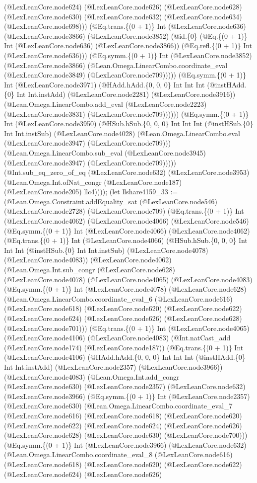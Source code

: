 \documentclass[11pt]{article}
\begin{document}
(@LexLeanCore.node624) (@LexLeanCore.node626) (@LexLeanCore.node628) (@LexLeanCore.node630) (@LexLeanCore.node632) (@LexLeanCore.node634) (@LexLeanCore.node698))) (@Eq.trans.\{(0 + 1)\} Int (@LexLeanCore.node636) (@LexLeanCore.node3866) (@LexLeanCore.node3852) (@id.\{0\} (@Eq.\{(0 + 1)\} Int (@LexLeanCore.node636) (@LexLeanCore.node3866)) (@Eq.refl.\{(0 + 1)\} Int (@LexLeanCore.node636))) (@Eq.symm.\{(0 + 1)\} Int (@LexLeanCore.node3852) (@LexLeanCore.node3866) (@Lean.Omega.LinearCombo.coordinate\_eval (@LexLeanCore.node3849) (@LexLeanCore.node709))))) (@Eq.symm.\{(0 + 1)\} Int (@LexLeanCore.node3971) (@HAdd.hAdd.\{0, 0, 0\} Int Int Int (@instHAdd.\{0\} Int Int.instAdd) (@LexLeanCore.node2281) (@LexLeanCore.node3916)) (@Lean.Omega.LinearCombo.add\_eval (@LexLeanCore.node2223) (@LexLeanCore.node3831) (@LexLeanCore.node709)))))) (@Eq.symm.\{(0 + 1)\} Int (@LexLeanCore.node3950) (@HSub.hSub.\{0, 0, 0\} Int Int Int (@instHSub.\{0\} Int Int.instSub) (@LexLeanCore.node4028) (@Lean.Omega.LinearCombo.eval (@LexLeanCore.node3947) (@LexLeanCore.node709))) (@Lean.Omega.LinearCombo.sub\_eval (@LexLeanCore.node3945) (@LexLeanCore.node3947) (@LexLeanCore.node709))))) (@Int.sub\_eq\_zero\_of\_eq (@LexLeanCore.node632) (@LexLeanCore.node3953) (@Lean.Omega.Int.ofNat\_congr (@LexLeanCore.node187) (@LexLeanCore.node205) llc4)))); (let llshare4159\_33 := (@Lean.Omega.Constraint.addEquality\_sat (@LexLeanCore.node546) (@LexLeanCore.node2728) (@LexLeanCore.node709) (@Eq.trans.\{(0 + 1)\} Int (@LexLeanCore.node4062) (@LexLeanCore.node4066) (@LexLeanCore.node546) (@Eq.symm.\{(0 + 1)\} Int (@LexLeanCore.node4066) (@LexLeanCore.node4062) (@Eq.trans.\{(0 + 1)\} Int (@LexLeanCore.node4066) (@HSub.hSub.\{0, 0, 0\} Int Int Int (@instHSub.\{0\} Int Int.instSub) (@LexLeanCore.node4078) (@LexLeanCore.node4083)) (@LexLeanCore.node4062) (@Lean.Omega.Int.sub\_congr (@LexLeanCore.node628) (@LexLeanCore.node4078) (@LexLeanCore.node4065) (@LexLeanCore.node4083) (@Eq.symm.\{(0 + 1)\} Int (@LexLeanCore.node4078) (@LexLeanCore.node628) (@Lean.Omega.LinearCombo.coordinate\_eval\_6 (@LexLeanCore.node616) (@LexLeanCore.node618) (@LexLeanCore.node620) (@LexLeanCore.node622) (@LexLeanCore.node624) (@LexLeanCore.node626) (@LexLeanCore.node628) (@LexLeanCore.node701))) (@Eq.trans.\{(0 + 1)\} Int (@LexLeanCore.node4065) (@LexLeanCore.node4106) (@LexLeanCore.node4083) (@Int.natCast\_add (@LexLeanCore.node174) (@LexLeanCore.node187)) (@Eq.trans.\{(0 + 1)\} Int (@LexLeanCore.node4106) (@HAdd.hAdd.\{0, 0, 0\} Int Int Int (@instHAdd.\{0\} Int Int.instAdd) (@LexLeanCore.node2357) (@LexLeanCore.node3966)) (@LexLeanCore.node4083) (@Lean.Omega.Int.add\_congr (@LexLeanCore.node630) (@LexLeanCore.node2357) (@LexLeanCore.node632) (@LexLeanCore.node3966) (@Eq.symm.\{(0 + 1)\} Int (@LexLeanCore.node2357) (@LexLeanCore.node630) (@Lean.Omega.LinearCombo.coordinate\_eval\_7 (@LexLeanCore.node616) (@LexLeanCore.node618) (@LexLeanCore.node620) (@LexLeanCore.node622) (@LexLeanCore.node624) (@LexLeanCore.node626) (@LexLeanCore.node628) (@LexLeanCore.node630) (@LexLeanCore.node700))) (@Eq.symm.\{(0 + 1)\} Int (@LexLeanCore.node3966) (@LexLeanCore.node632) (@Lean.Omega.LinearCombo.coordinate\_eval\_8 (@LexLeanCore.node616) (@LexLeanCore.node618) (@LexLeanCore.node620) (@LexLeanCore.node622) (@LexLeanCore.node624) (@LexLeanCore.node626) 
\end{document}

